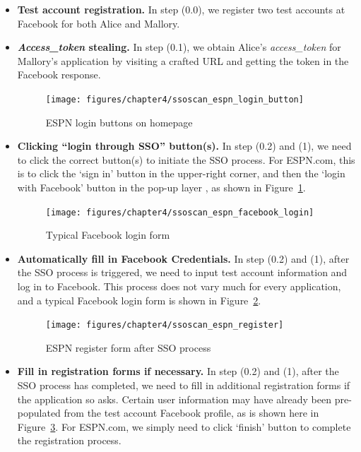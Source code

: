 \begin{itemize}

\item \textbf{Test account registration.}  In step (0.0), we register two test accounts at Facebook for both Alice and Mallory.

\item \textbf{\emph{Access\_token} stealing.}  In step (0.1), we obtain Alice's \emph{access\_token} for Mallory's application by visiting a crafted URL and getting the token in the Facebook response.

\begin{figure}[hbt]
\centering
\texttt{[image: figures/chapter4/ssoscan\_espn\_login\_button]}
\caption{ESPN login buttons on homepage}
\label{fig:ssoscan_espn_login_button}
\end{figure}

\item \textbf{Clicking ``login through SSO'' button(s).}  In step (0.2) and (1), we need to click the correct button(s) to initiate the SSO process.  For ESPN.com, this is to click the `sign in' button in the upper-right corner, and then the `login with Facebook' button in the pop-up layer , as shown in Figure~\ref{fig:ssoscan_espn_login_button}.

\begin{figure}[bht]
\centering
\texttt{[image: figures/chapter4/ssoscan\_espn\_facebook\_login]}
\caption{Typical Facebook login form}
\label{fig:ssoscan_espn_facebook_login}
\end{figure}

\item \textbf{Automatically fill in Facebook Credentials.}  In step (0.2) and (1), after the SSO process is triggered, we need to input test account information and log in to Facebook.  This process does not vary much for every application, and a typical Facebook login form is shown in Figure~\ref{fig:ssoscan_espn_facebook_login}.

\begin{figure}[hbt]
\centering
\texttt{[image: figures/chapter4/ssoscan\_espn\_register]}
\caption{ESPN register form after SSO process}
\label{fig:ssoscan_espn_register}
\end{figure}

\item \textbf{Fill in registration forms if necessary.}  In step (0.2) and (1), after the SSO process has completed, we need to fill in additional registration forms if the application so asks.  Certain user information may have already been pre-populated from the test account Facebook profile, as is shown here in Figure~\ref{fig:ssoscan_espn_register}.  For ESPN.com, we simply need to click `finish' button to complete the registration process.


\end{itemize}
